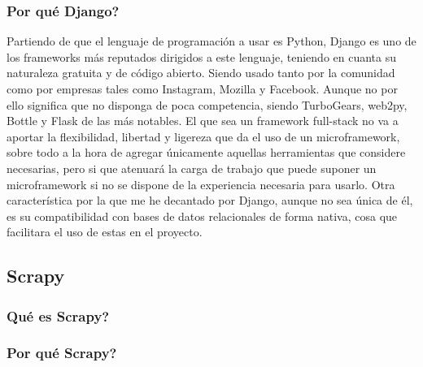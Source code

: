 \subsubsection{Por qué Django?}
Partiendo de que el lenguaje de programación a usar es Python, Django es uno de los frameworks más reputados dirigidos a este lenguaje, teniendo en cuanta su naturaleza gratuita y de código abierto. Siendo usado tanto por la comunidad como por empresas tales como Instagram, Mozilla y Facebook. Aunque no por ello significa que no disponga de poca competencia, siendo TurboGears, web2py, Bottle y Flask de las más notables.
\newline
\newline
El que sea un framework full-stack no va a aportar la flexibilidad, libertad y ligereza que da el uso de un microframework, sobre todo a la hora de agregar únicamente aquellas herramientas que considere necesarias, pero si que atenuará la carga de trabajo que puede suponer un microframework si no se dispone de la experiencia necesaria para usarlo.
\newline
\newline
Otra característica por la que me he decantado por Django, aunque no sea única de él, es su compatibilidad con bases de datos relacionales de forma nativa, cosa que facilitara el uso de estas en el proyecto.

\newpage

\subsection{Scrapy}

\subsubsection{Qué es Scrapy?}

\subsubsection{Por qué Scrapy?}